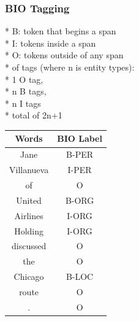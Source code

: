 \documentclass[13.5pt,aspecratio=169]{beamer}
\begin{document}
    \begin{frame}
    \frametitle{BIO Tagging}	
    \vspace{-100pt}
    \hspace{10pt}
        {* B: token that begins a span \\
    \hspace{10pt} * I: tokens inside a span\\
    \hspace{10pt} * O: tokens outside of any span \\
    \hspace{10pt} * of tags (where n is entity types): \\
    \hspace{10pt} * 1 O tag, \\
    \hspace{10pt} * n B tags, \\
    \hspace{10pt} * n I tags \\
    \hspace{10pt} * total of 2n+1}
    \vspace{-150pt}
    \begin{table}
        \begin{tabular}[b]{|c|c|}
        \hline
        \large Words &  \large BIO Label\\ 
        \hline \small
        Jane & \small B-PER \\ \small
        Villanueva & \small I-PER \\ \small
        of & \small O \\ \small
        United & \small B-ORG \\ \small
        Airlines & I-ORG \\ \small
        Holding & I-ORG \\ \small
        discussed & O \\ \small
        the & \small O \\ \small
        Chicago & \small B-LOC \\ \small
        route & \small O \\ \small
        . & \small O \\ 
    \hline
    \end{tabular}
    \end{table} 
    
    \end{frame}
    
\end{document}
